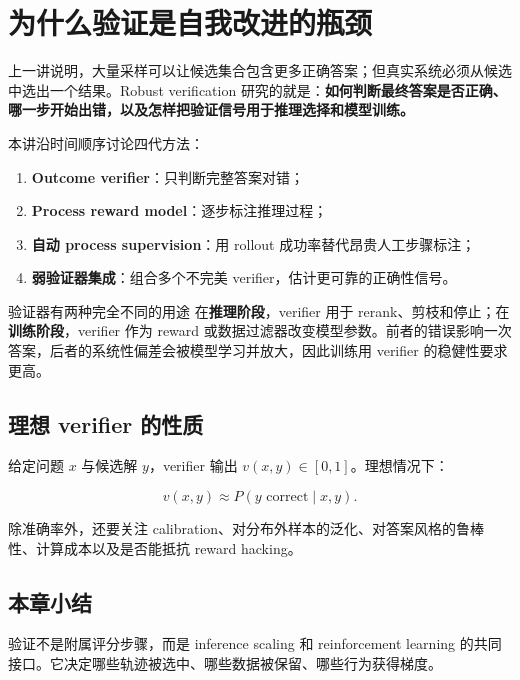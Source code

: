 \section{为什么验证是自我改进的瓶颈}

上一讲说明，大量采样可以让候选集合包含更多正确答案；但真实系统必须从候选中选出一个结果。Robust verification 研究的就是：\textbf{如何判断最终答案是否正确、哪一步开始出错，以及怎样把验证信号用于推理选择和模型训练。}

本讲沿时间顺序讨论四代方法：

\begin{enumerate}
    \item \textbf{Outcome verifier}：只判断完整答案对错；
    \item \textbf{Process reward model}：逐步标注推理过程；
    \item \textbf{自动 process supervision}：用 rollout 成功率替代昂贵人工步骤标注；
    \item \textbf{弱验证器集成}：组合多个不完美 verifier，估计更可靠的正确性信号。
\end{enumerate}

\begin{importantbox}{验证器有两种完全不同的用途}
在\textbf{推理阶段}，verifier 用于 rerank、剪枝和停止；在\textbf{训练阶段}，verifier 作为 reward 或数据过滤器改变模型参数。前者的错误影响一次答案，后者的系统性偏差会被模型学习并放大，因此训练用 verifier 的稳健性要求更高。
\end{importantbox}

\subsection{理想 verifier 的性质}

给定问题 $x$ 与候选解 $y$，verifier 输出 $v(x,y)\in[0,1]$。理想情况下：

$$
v(x,y)\approx P(y\text{ correct}\mid x,y).
$$

除准确率外，还要关注 calibration、对分布外样本的泛化、对答案风格的鲁棒性、计算成本以及是否能抵抗 reward hacking。

\subsection{本章小结}

验证不是附属评分步骤，而是 inference scaling 和 reinforcement learning 的共同接口。它决定哪些轨迹被选中、哪些数据被保留、哪些行为获得梯度。

